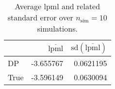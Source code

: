 \begin{table}[H]

\caption{Average lpml and related standard error over $n_{\text{sim}} = 10$ simulations.}
\centering
\begin{tabular}[t]{lrr}
\toprule
  & $\overbar{\text{lpml}}$ & $\text{sd}(\overbar{\text{lpml}})$\\
\midrule
DP & -3.655767 & 0.0621195\\
True & -3.596149 & 0.0630094\\
\bottomrule
\end{tabular}
\end{table}